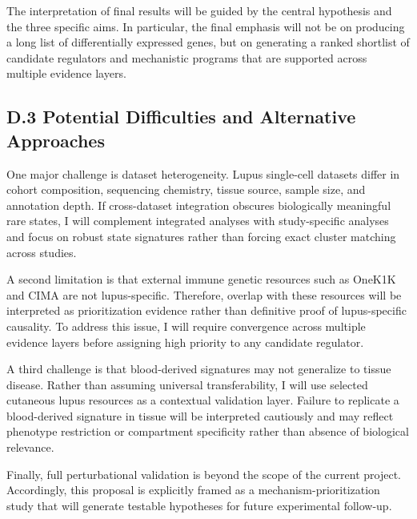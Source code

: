 The interpretation of final results will be guided by the central hypothesis and the three specific aims. In particular, the final emphasis will not be on producing a long list of differentially expressed genes, but on generating a ranked shortlist of candidate regulators and mechanistic programs that are supported across multiple evidence layers.

\subsection*{D.3 Potential Difficulties and Alternative Approaches}

One major challenge is dataset heterogeneity. Lupus single-cell datasets differ in cohort composition, sequencing chemistry, tissue source, sample size, and annotation depth. If cross-dataset integration obscures biologically meaningful rare states, I will complement integrated analyses with study-specific analyses and focus on robust state signatures rather than forcing exact cluster matching across studies.

A second limitation is that external immune genetic resources such as OneK1K and CIMA are not lupus-specific. Therefore, overlap with these resources will be interpreted as prioritization evidence rather than definitive proof of lupus-specific causality. To address this issue, I will require convergence across multiple evidence layers before assigning high priority to any candidate regulator.

A third challenge is that blood-derived signatures may not generalize to tissue disease. Rather than assuming universal transferability, I will use selected cutaneous lupus resources as a contextual validation layer. Failure to replicate a blood-derived signature in tissue will be interpreted cautiously and may reflect phenotype restriction or compartment specificity rather than absence of biological relevance.

Finally, full perturbational validation is beyond the scope of the current project. Accordingly, this proposal is explicitly framed as a mechanism-prioritization study that will generate testable hypotheses for future experimental follow-up.

